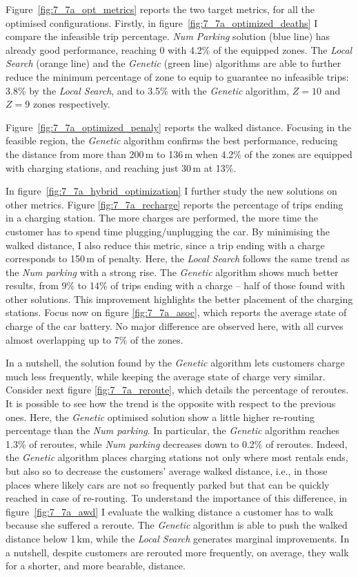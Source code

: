 Figure~\ref{fig:7_7a_opt_metrics} reports the two target metrics, for all the optimised configurations.
Firstly, in figure~\ref{fig:7_7a_optimized_deaths} I compare the infeasible trip percentage. \textit{Num Parking} solution (blue line) has already good performance, reaching 0 with 4.2\% of the equipped zones. 
The \textit{Local Search} (orange line) and the \textit{Genetic} (green line) algorithms are able to further reduce the minimum percentage of zone to equip to guarantee no infeasible trips: 3.8\% by the \textit{Local Search}, and to 3.5\% with the \textit{Genetic} algorithm, $Z=10$ and $Z=9$ zones respectively.


Figure~\ref{fig:7_7a_optimized_penaly} reports the walked distance. Focusing in the feasible region, the \textit{Genetic} algorithm confirms the best performance, reducing the distance from more than 200\,m to 136\,m when 4.2\% of the zones are equipped with charging stations, and reaching just 30\,m at 13\%. 


In figure~\ref{fig:7_7a_hybrid_optimization} I further study the new solutions on other metrics.
Figure \ref{fig:7_7a_recharge} reports the percentage of trips ending in a charging station. The more charges are performed, the more time the customer has to spend time plugging/unplugging the car. By minimising the walked distance, I also reduce this metric, since a trip ending with a charge corresponds to 150\,m of penalty.
Here, the \textit{Local Search} follows the same trend as the \textit{Num parking} with a strong rise. The \textit{Genetic} algorithm shows much better results, from 9\% to 14\% of trips ending with a charge -- half of those found with other solutions. 
This improvement highlights the better placement of the charging stations.
Focus now on figure \ref{fig:7_7a_asoc}, which reports the average state of charge of the car battery. 
No major difference are observed here, with all curves almost overlapping up to 7\% of the zones.

In a nutshell, the solution found by the \textit{Genetic} algorithm lets customers charge much less frequently, while keeping the average state of charge very similar. Consider next figure \ref{fig:7_7a_reroute}, which details the percentage of reroutes. It is possible to see how the trend is the opposite with respect to the previous ones. Here, the \textit{Genetic} optimised solution show a little higher re-routing percentage than the \textit{Num parking}. In particular, the \textit{Genetic} algorithm reaches 1.3\% of reroutes, while \textit{Num parking} decreases down to 0.2\% of reroutes. Indeed, the \textit{Genetic} algorithm places charging stations not only where most rentals ends, but also so to decrease the customers' average walked distance, i.e., in those places where likely cars are not so frequently parked but that can be quickly reached in case of re-routing.
To understand the importance of this difference, in figure~\ref{fig:7_7a_awd} I evaluate the walking distance a customer has to walk because she suffered a reroute.  
The \textit{Genetic} algorithm is able to push the walked distance below 1\,km, while the \textit{Local Search} generates marginal improvements.
In a nutshell, despite customers are rerouted more frequently, on average, they walk for a shorter, and  more bearable, distance.


